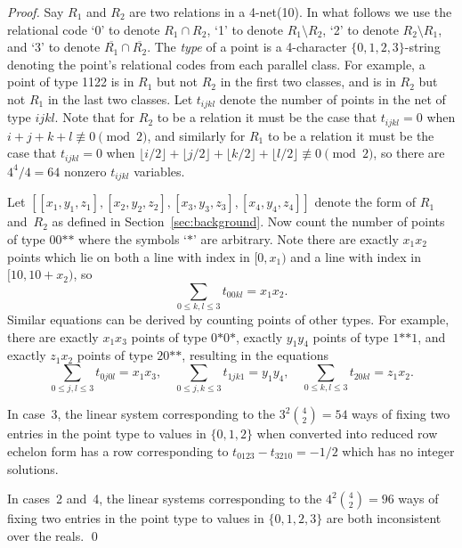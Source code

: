 \documentclass[10pt,a4paper]{amsart}
\begin{document}
\begin{proof}
Say $R_1$ and $R_2$ are two relations in a 4-net(10).
In what follows we use the relational code `0' to denote $R_1\cap R_2$, `1' to denote $R_1\setminus R_2$,
`2' to denote $R_2\setminus R_1$, and `3' to denote $\overline{R_1}\cap\overline{R_2}$.
The \emph{type} of a point is a 4-character $\{0,1,2,3\}$-string denoting the point's relational codes
from each parallel class.  For example, a point of type 1122 is in $R_1$ but not $R_2$ in the first
two classes, and is in $R_2$ but not $R_1$ in the last two classes.
Let $t_{ijkl}$ denote the number of points in the net of type $ijkl$.
Note that for $R_2$ to be a relation it must be the case that $t_{ijkl}=0$ when $i+j+k+l\not\equiv0\pmod{2}$,
and similarly for $R_1$ to be a relation it must be the case that $t_{ijkl}=0$ when
$\lfloor i/2\rfloor+\lfloor j/2\rfloor+\lfloor k/2\rfloor+\lfloor l/2\rfloor\not\equiv0\pmod{2}$,
so there are $4^4/4=64$ nonzero $t_{ijkl}$ variables.

Let $[[x_1,y_1,z_1],[x_2,y_2,z_2],[x_3,y_3,z_3],[x_4,y_4,z_4]]$ denote the form of $R_1$ and~$R_2$
as defined in Section~\ref{sec:background}.
Now count the number of points of type $00\mathord{*}\mathord{*}$ where the symbols `$*$' are arbitrary.
Note there are exactly $x_1x_2$ points which lie on both a line with index in $[0,x_1)$ and a line with index in $[10,10+x_2)$,
so
\begin{equation} \sum_{0\leq k,l\leq 3} t_{00kl} = x_1x_2 . \end{equation}
Similar equations can be derived by counting points of other types.
For example, there are exactly $x_1x_3$ points of type $0\mathord{*}0\mathord{*}$, exactly $y_1y_4$
points of type $1\mathord{*}\mathord{*}1$, and exactly $z_1x_2$ points of type $20\mathord{*}\mathord{*}$,
resulting in the equations
\begin{equation} \sum_{0\leq j,l\leq 3} t_{0j0l} = x_1x_3, \quad \sum_{0\leq j,k\leq 3} t_{1jk1} = y_1y_4, \quad \sum_{0\leq k,l\leq 3} t_{20kl} = z_1x_2 . \end{equation}

In case~3, the linear system corresponding to the $3^2\binom{4}{2}=54$ ways of fixing
two entries in the point type to values in $\{0,1,2\}$ when converted into reduced row echelon form
has a row corresponding to $t_{0123}-t_{3210}=-1/2$ which has
no integer solutions.

In cases~2 and~4, the linear systems corresponding to the $4^2\binom{4}{2}=96$ ways of fixing
two entries in the point type to values in $\{0,1,2,3\}$ are both inconsistent over the reals. \qed
\end{proof}
\end{document}
